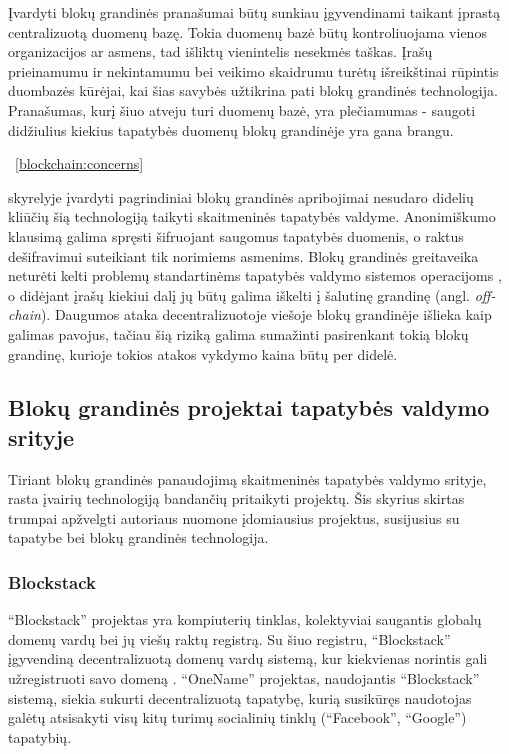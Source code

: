 Įvardyti blokų grandinės pranašumai būtų sunkiau įgyvendinami taikant įprastą centralizuotą duomenų bazę. Tokia duomenų bazė
būtų kontroliuojama vienos organizacijos ar asmens, tad išliktų vienintelis nesekmės taškas. Įrašų prieinamumu ir nekintamumu bei veikimo
skaidrumu
turėtų išreikštinai rūpintis duombazės kūrėjai, kai šias savybės užtikrina pati blokų grandinės technologija. Pranašumas, kurį
šiuo atveju turi duomenų bazė, yra plečiamumas - saugoti didžiulius kiekius tapatybės duomenų blokų grandinėje yra gana brangu.

\hypertarget{blockchain:concerns}{~\ref{blockchain:concerns}} skyrelyje įvardyti pagrindiniai blokų grandinės apribojimai nesudaro didelių kliūčių šią technologiją taikyti skaitmeninės tapatybės valdyme.
Anonimiškumo klausimą galima spręsti šifruojant saugomus tapatybės duomenis,
o raktus dešifravimui suteikiant tik norimiems asmenims. Blokų grandinės greitaveika neturėti kelti problemų
standartinėms tapatybės valdymo sistemos operacijoms \cite{Lo2017}, o didėjant įrašų kiekiui dalį jų būtų galima iškelti į
šalutinę grandinę (angl. \textit{off-chain}). Daugumos ataka decentralizuotoje viešoje blokų grandinėje išlieka kaip galimas pavojus,
tačiau šią riziką galima sumažinti pasirenkant tokią blokų grandinę, kurioje tokios atakos vykdymo kaina būtų per didelė.

\subsection{Blokų grandinės projektai tapatybės valdymo srityje} \label{section:relatedWork}

Tiriant blokų grandinės panaudojimą skaitmeninės tapatybės valdymo srityje, rasta įvairių
technologiją bandančių pritaikyti projektų. Šis skyrius skirtas trumpai apžvelgti autoriaus nuomone
įdomiausius projektus, susijusius su tapatybe bei blokų grandinės technologija.

\subsubsection{Blockstack}

\enquote{Blockstack} projektas yra kompiuterių tinklas, kolektyviai saugantis globalų
domenų vardų bei jų viešų raktų registrą. Su šiuo registru, \enquote{Blockstack} įgyvendiną
decentralizuotą domenų vardų sistemą, kur kiekvienas norintis gali užregistruoti savo domeną \cite{BlockstackWhitepaper}.
\enquote{OneName} projektas, naudojantis \enquote{Blockstack} sistemą, siekia sukurti decentralizuotą tapatybę,
kurią susikūręs naudotojas galėtų atsisakyti visų kitų turimų socialinių tinklų (\enquote{Facebook},
\enquote{Google}) tapatybių.


